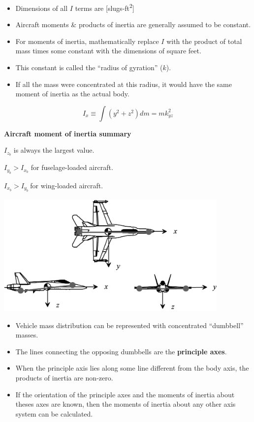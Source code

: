 \documentclass[
]{book}
\providecommand{\tightlist}{%
  \setlength{\itemsep}{0pt}\setlength{\parskip}{0pt}}
\begin{document}
\begin{itemize}
\tightlist
\item
  Dimensions of all \(I\) terms are {[}slugs-ft\textsuperscript{2}{]}
\item
  Aircraft moments \& products of inertia are generally assumed to be constant.
\item
  For moments of inertia, mathematically replace \(I\) with the product of total mass times some constant with the dimensions of square feet.
\item
  This constant is called the ``radius of gyration'' (\(k\)).
\item
  If all the mass were concentrated at this radius, it would have the same moment of inertia as the actual body.
\end{itemize}

\[ I_x \equiv \int \left( y^2 + z^2 \right) dm = mk^2_{yz} \]

\textbf{Aircraft moment of inertia summary}

\(I_{z_b}\) is always the largest value.

\(I_{y_b} \gt I_{x_b}\) for fuselage-loaded aircraft.

\(I_{x_b} \gt I_{y_b}\ \)for wing-loaded aircraft.

\includegraphics[width=4.5in,height=2.375in]{media/07/image19.svg}

\begin{itemize}
\tightlist
\item
  Vehicle mass distribution can be represented with concentrated ``dumbbell'' masses.
\item
  The lines connecting the opposing dumbbells are the \textbf{principle axes}.
\item
  When the principle axis lies along some line different from the body axis, the products of inertia are non-zero.
\item
  If the orientation of the principle axes and the moments of inertia about theses axes are known, then the moments of inertia about any other axis system can be calculated.
\end{itemize}
\end{document}

